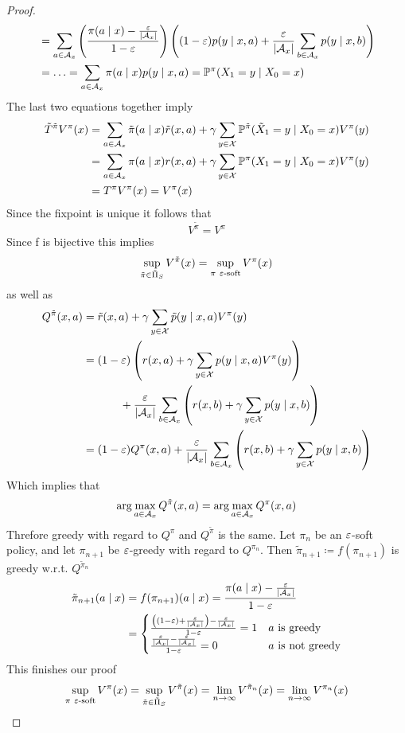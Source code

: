\begin{proof}
\begin{align*}
		&=\sum_{a\in\mathcal{A}_x}\left(\frac{\pi(a\mid x)-\frac{\varepsilon}{|\mathcal{A}_x|}}{1-\varepsilon} \right)
		\left((1-\varepsilon)p(y\mid x,a)+\frac{\varepsilon}{|\mathcal{A}_x|}\sum_{b\in\mathcal{A}_x}p(y\mid x,b)\right)\\
		&=\dotsc = \sum_{a\in\mathcal{A}_x} \pi(a\mid x)p(y\mid x,a) =\mathbb{P}^\pi(X_1=y\mid X_0=x)
	\end{align*}
	The last two equations together imply
	\begin{align*}
		\tilde{T}^{\tilde{\pi}}V^\pi(x)&=\sum_{a\in\mathcal{A}_x}\tilde{\pi}(a\mid x)\tilde{r}(x,a) 
		+ \gamma \sum_{y\in\mathcal{X}}\mathbb{P}^{\tilde{\pi}}(\tilde{X}_1=y\mid X_0=x)V^\pi(y)\\
		&=\sum_{a\in\mathcal{A}_x}\pi(a\mid x)r(x,a) + \gamma \sum_{y\in\mathcal{X}}\mathbb{P}^\pi(X_1=y\mid X_0=x)V^\pi(y)\\
		&=T^\pi V^\pi(x)=V^\pi(x)
	\end{align*}
	Since the fixpoint is unique it follows that
	\[
		V^{\tilde{\pi}}=V^\pi
	\]
	Since f is bijective this implies
	\[
		\sup_{\tilde{\pi}\in \tilde{\Pi}_S}V^{\tilde{\pi}}(x)=\sup_{\pi\ \varepsilon\text{-soft}} V^\pi(x)
	\]
	as well as
	\begin{align*}
		Q^{\tilde{\pi}}(x,a)&=\tilde{r}(x,a)+\gamma \sum_{y\in\mathcal{X}} \tilde{p}(y\mid x,a) V^\pi(y)\\
		&=\begin{aligned}[t]
			&(1-\varepsilon)\left(r(x,a)+\gamma \sum_{y\in\mathcal{X}}p(y\mid x,a) V^\pi(y) \right)\\
			&\qquad + \frac{\varepsilon}{|\mathcal{A}_x|}\sum_{b\in\mathcal{A}_x}\left(r(x,b)+\gamma \sum_{y\in\mathcal{X}}p(y\mid x,b) \right)
		\end{aligned}\\
		&=(1-\varepsilon)Q^\pi(x,a)
		+ \frac{\varepsilon}{|\mathcal{A}_x|}\sum_{b\in\mathcal{A}_x}\left(r(x,b)+\gamma \sum_{y\in\mathcal{X}}p(y\mid x,b) \right)
	\end{align*}
	Which implies that
	\[
		\arg\max_{a\in\mathcal{A}_x} Q^{\tilde{\pi}}(x,a)=\arg\max_{a\in\mathcal{A}_x} Q^\pi(x,a)
	\]
	Threfore greedy with regard to \(Q^\pi\) and \(Q^{\tilde{\pi}}\) is the same. Let \(\pi_n\) be an \(\varepsilon\)-soft policy, and let \(\pi_{n+1}\) be \(\varepsilon\)-greedy with regard to 
	\(Q^{\pi_n}\). Then \(\tilde{\pi}_{n+1}\coloneqq f(\pi_{n+1})\) is greedy w.r.t. 
	\(Q^{\tilde{\pi}_n}\)
	\begin{align*}
		\tilde{\pi}_{n+1}(a\mid x)&=f(\pi_{n+1})(a\mid x)
		=\frac{\pi(a\mid x)-\frac{\varepsilon}{|\mathcal{A}_x|}}{1-\varepsilon}\\
		&=\begin{cases}
			\frac{\left((1-\varepsilon) + \frac{\varepsilon}{|\mathcal{A}_x|}\right) -\frac{\varepsilon}{|\mathcal{A}_x|}}{1-\varepsilon}=1 & a \text{ is greedy}\\
			\frac{\frac{\varepsilon}{|\mathcal{A}_x|}- \frac{\varepsilon}{|\mathcal{A}_x|}}{1-\varepsilon}=0 & a \text{ is not greedy}
		\end{cases}
	\end{align*}
	This finishes our proof
	\[
		\sup_{\pi\ \varepsilon\text{-soft}} V^\pi(x)
		=\sup_{\tilde{\pi}\in \tilde{\Pi}_S}V^{\tilde{\pi}}(x)
		=\lim_{n\to\infty} V^{\tilde{\pi}_n}(x)
		=\lim_{n\to\infty} V^{\pi_n}(x)
		\qedhere
	\]
\end{proof}


